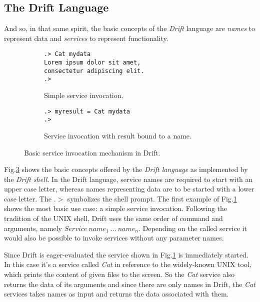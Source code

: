 \subsection{The Drift Language}
\label{driftlang}

And so, in that same spirit, the basic concepts of the \textit{Drift}
language are \textit{names} to represent data and \textit{services}
to represent functionality.

\begin{figure}[h]
    \centering
    \begin{subfigure}[b]{0.4\textwidth}

  \begin{lstlisting}
.> Cat mydata
Lorem ipsum dolor sit amet,
consectetur adipiscing elit.
.>
  \end{lstlisting}

        \caption{Simple service invocation.}
        \label{cat1}
    \end{subfigure}
    \hspace{20pt} %
    \begin{subfigure}[b]{0.4\textwidth}

  \begin{lstlisting}
.> myresult = Cat mydata
.>
  \end{lstlisting}

        \caption{Service invocation with result bound to a name.}
        \label{cat2}
    \end{subfigure}
    \caption{Basic service invocation mechanism in Drift.}\label{drift-examples1}
\end{figure}

Fig.\ref{drift-examples1} shows the basic concepts offered by
the \textit{Drift language} as implemented by the \textit{Drift shell}.
In the Drift language, service names are required to
start with an upper case letter, whereas names representing
data are to be started with a lower case letter. The $.>$ symbolizes
the shell prompt. The first example of Fig.\ref{cat1}
shows the most basic use case: a simple service invocation.
Following the tradition of the UNIX shell, Drift uses the same
order of command and arguments, namely
$Service\ name_{1}\ ...\ name_{n}$.
Depending on the called service it would also be possible to
invoke services without any parameter names.

Since Drift is eager-evaluated the service shown in
Fig.\ref{cat1} is immediately started. In this case it's
a service called \textit{Cat} in reference to the widely-known
UNIX tool, which prints the content of given files to the screen.
So the \textit{Cat} service also returns the data of its arguments and
since there are only names in Drift, the \textit{Cat} services takes names
as input and returns the data associated with them.

